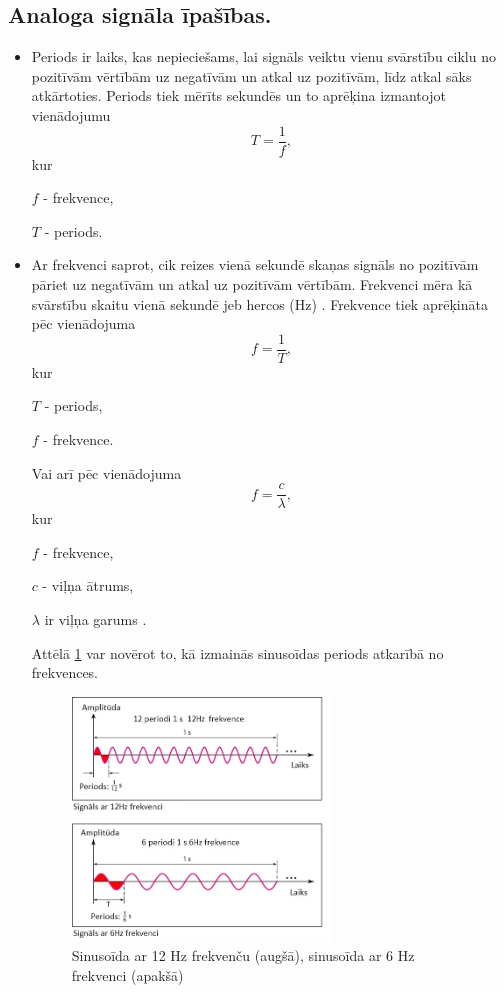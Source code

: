 \documentclass[12pt,paper=A4]{report}
\begin{document}
\subsection{Analoga signāla īpašības.}
\begin{itemize}
\item Periods ir laiks, kas nepieciešams, lai signāls veiktu  vienu svārstību ciklu no pozitīvām vērtībām uz negatīvām un atkal uz pozitīvām, līdz atkal sāks atkārtoties. Periods tiek mērīts sekundēs \cite{http://ecomputernotes.com/computernetworkingnotes/communication-networks/analog-signal} un to aprēķina izmantojot vienādojumu 
\begin{equation}
T = \frac{1}{f},
\end{equation}
kur 

$f$ - frekvence,

$T$ - periods.

\item Ar frekvenci saprot, cik  reizes vienā sekundē skaņas signāls no pozitīvām pāriet uz negatīvām un atkal uz pozitīvām vērtībām. Frekvenci mēra kā svārstību skaitu vienā sekundē jeb hercos (Hz) \cite{frequency}. Frekvence tiek aprēķināta pēc vienādojuma
\begin{equation}
f = \frac{1}{T},
\end{equation}
kur 

$T$ - periods,

$f$ - frekvence.

Vai arī pēc vienādojuma 
\begin{equation}
f= \frac{c}{\lambda},
\end{equation}
kur 

$f$ - frekvence,

$c$ - viļņa ātrums,

$\lambda$ ir viļņa garums \cite{http://www.sengpielaudio.com/calculator-period.htm}. 

Attēlā \ref{period} var novērot to, kā izmainās sinusoīdas periods atkarībā no frekvences.

\begin{figure}[H] \centering
\includegraphics[width=0.65\textwidth]{frequency} 
\caption{Sinusoīda ar 12 Hz frekvenču (augšā), sinusoīda ar 6 Hz frekvenci (apakšā) \cite{properties}}  \label{period} 
\end{figure}


\end{itemize}
\end{document}

